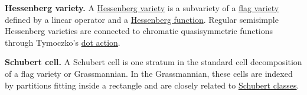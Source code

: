 \textbf{Hessenberg variety.}
A \hyperref[hessenbergVarietyDefinition]{Hessenberg variety} is a subvariety
of a \hyperref[flagVarietyDefinition]{flag variety} defined by a linear
operator and a \hyperref[hessenbergFunctionDefinition]{Hessenberg function}.
Regular semisimple Hessenberg varieties are connected to chromatic
quasisymmetric functions through Tymoczko's
\hyperref[tymoczkoDotAction]{dot action}.

\textbf{Schubert cell.}
A Schubert cell is one stratum in the standard cell decomposition of a flag
variety or Grassmannian.  In the Grassmannian, these cells are indexed by
partitions fitting inside a rectangle and are closely related to
\hyperref[grassmannianSchubertClasses]{Schubert classes}.
